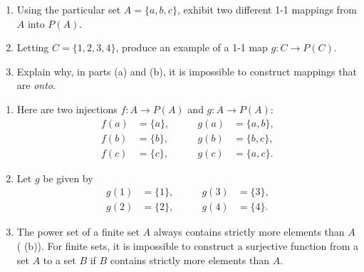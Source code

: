\documentclass{lew98_solutions}
\begin{document}
\begin{exercise}
\label{ex:1.6.6}
    \begin{enumerate}
        \item Using the particular set \( A = \{ a, b, c \} \), exhibit two different 1-1 mappings from \( A \) into \( P(A) \).

        \item Letting \( C = \{ 1, 2, 3, 4 \} \), produce an example of a 1-1 map \( g : C \to P(C) \).

        \item Explain why, in parts (a) and (b), it is impossible to construct mappings that are \textit{onto}.
    \end{enumerate}
\end{exercise}

\begin{solution}
    \begin{enumerate}
        \item Here are two injections \( f : A \to P(A) \) and \( g : A \to P(A) \):
        \[
            \begin{aligned}
                f(a) &= \{ a \}, \\
                f(b) &= \{ b \}, \\
                f(c) &= \{ c \},
            \end{aligned}
            \qquad
            \begin{aligned}
                g(a) &= \{ a, b \}, \\
                g(b) &= \{ b, c \}, \\
                g(c) &= \{ a, c \}.
            \end{aligned}
        \]

        \item Let \( g \) be given by
        \[
            \begin{aligned}
                g(1) &= \{ 1 \}, \\
                g(2) &= \{ 2 \},
            \end{aligned}
            \qquad
            \begin{aligned}
                g(3) &= \{ 3 \}, \\
                g(4) &= \{ 4 \}.
            \end{aligned}
        \]

        \item The power set of a finite set \( A \) always contains strictly more elements than \( A \) ( (b)). For finite sets, it is impossible to construct a surjective function from a set \( A \) to a set \( B \) if \( B \) contains strictly more elements than \( A \).
    \end{enumerate}
\end{solution}
\end{document}
